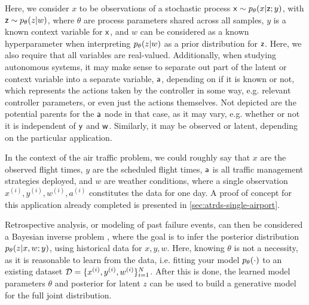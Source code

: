 Here, we consider $x$ to be observations of a stochastic process $\rx\sim \pld{x\given \rz;y}$, with $\rz\sim \pld{z\given w}$, where $\theta$ are process parameters shared across all samples, $y$ is a known context variable for $\mathsf x$, and $w$ can be considered as a known hyperparameter when interpreting $\pld{z\given w}$ as a prior distribution for $\mathsf z$. Here, we also require that all variables are real-valued. Additionally, when studying autonomous systems, it may make sense to separate out part of the latent or context variable into a separate variable, $\mathsf a$, depending on if it is known or not, which represents the actions taken by the controller in some way, e.g. relevant controller parameters, or even just the actions themselves. Not depicted are the potential parents for the $\mathsf a$ node in that case, as it may vary, e.g. whether or not it is independent of $\mathsf y$ and $\mathsf w$. Similarly, it may be observed or latent, depending on the particular application.

In the context of the air traffic problem, we could roughly say that $x$ are the observed flight times, $y$ are the scheduled flight times, $\mathsf a$ is all traffic management strategies deployed, and $w$ are weather conditions, where a single observation $x^{(i)},y^{(i)},w^{(i)},a^{(i)}$ constitutes the data for one day. A proof of concept for this application already completed is presented in \cref{sec:atrds-single-airport}.

Retrospective analysis, or modeling of past failure events, can then be considered a Bayesian inverse problem \cite{stuart2010inverse}, where the goal is to infer the posterior distribution $\pld{z\given x,w;y}$, using historical data for $x,y,w$. Here, knowing $\theta$ is not a necessity, as it is reasonable to learn from the data, i.e. fitting your model $\pld{\cdot}$ to an existing dataset $\mathcal D = \{x^{(i)},y^{(i)},w^{(i)}\}_{i=1}^N$. After this is done, the learned model parameters $\theta$ and posterior for latent $z$ can be used to build a generative model for the full joint distribution.

